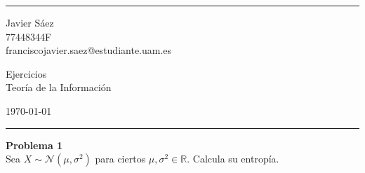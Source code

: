 \documentclass[a4paper]{article}
\newenvironment{problem}[2][Problema]
    { \begin{mdframed}[backgroundcolor=gray!20] \textbf{#1 #2} \\}
    {  \end{mdframed}}
\begin{document}

\fancyhead[C]{}
\hrule \medskip %
\begin{minipage}{0.295\textwidth} 
\raggedright
\footnotesize
Javier Sáez \hfill\\   
77448344F \hfill\\
franciscojavier.saez@estudiante.uam.es
\end{minipage}
\begin{minipage}{0.4\textwidth} 
\centering 
\large 
Ejercicios\\ 
\normalsize 
Teoría de la Información\\ 
\end{minipage}
\begin{minipage}{0.295\textwidth} 
\raggedleft
\today\hfill\\
\end{minipage}
\medskip\hrule 
\bigskip



\begin{problem}{1}
Sea $X \sim \mathcal N(\mu, \sigma^2)$ para ciertos $\mu,\sigma^2 \in \mathbb R$. Calcula su entropía.\\
\end{problem}
\end{document}
